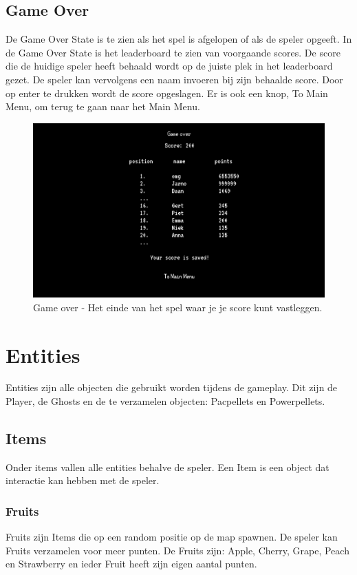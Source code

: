 \documentclass{report}
\begin{document}
  \section{Game Over} %
  \label{sec:game_over}
  De Game Over State is te zien als het spel is afgelopen of als de speler opgeeft. In de Game Over State is het leaderboard te zien van voorgaande scores. De score die de huidige speler heeft behaald wordt op de juiste plek in het leaderboard gezet. De speler kan vervolgens een naam invoeren bij zijn behaalde score. Door op enter te drukken wordt de score opgeslagen. Er is ook een knop, To Main Menu, om terug te gaan naar het Main Menu.
  \begin{figure}[h]
      \centering
      \includegraphics[width=\textwidth]{technisch verslag imgs/game over.png}
      \caption{Game over - Het einde van het spel waar je je score kunt vastleggen.}
    \end{figure}

\chapter{Entities} %
\label{cha:entities}
Entities zijn alle objecten die gebruikt worden tijdens de gameplay. Dit zijn de Player, de Ghosts en de te verzamelen objecten: Pacpellets en Powerpellets.

  \section{Items} %
  \label{sec:items}
  Onder items vallen alle entities behalve de speler. Een Item is een object dat interactie kan hebben met de speler.

    \subsection{Fruits} %
    \label{sub:fruits}
    Fruits zijn Items die op een random positie op de map spawnen. De speler kan Fruits verzamelen voor meer punten. De Fruits zijn: Apple, Cherry, Grape, Peach en Strawberry en ieder Fruit heeft zijn eigen aantal punten.
\end{document}
